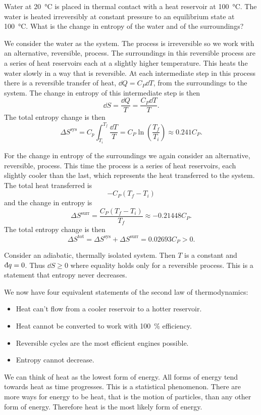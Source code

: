 \documentclass[a4paper]{article}
\newcommand{\sys}{{\mathrm{sys}}}
\newcommand{\surr}{{\mathrm{surr}}}
\newcommand{\tot}{{\mathrm{tot}}}
\newcommand{\ddbar}[1]{\text{\dj}{#1}}
\begin{document}
    \begin{example}\label{exa:heating water}
        Water at \SI{20}{\degreeCelsius} is placed in thermal contact with a heat reservoir at \SI{100}{\degreeCelsius}.
        The water is heated irreversibly at constant pressure to an equilibrium state at \SI{100}{\degreeCelsius}.
        What is the change in entropy of the water and of the surroundings?
        
        We consider the water as the system.
        The process is irreversible so we work with an alternative, reversible, process.
        The surroundings in this reversible process are a series of heat reservoirs each at a slightly higher temperature.
        This heats the water slowly in a way that is reversible.
        At each intermediate step in this process there is a reversible transfer of heat, \(\dd{Q} = C_P\dd{T}\), from the surroundings to the system.
        The change in entropy of this intermediate step is then
        \[\dd{S} = \frac{\dd{Q}}{T} = \frac{C_P\dd{T}}{T}.\]
        The total entropy change is then
        \[\Delta S^\sys = C_p\int_{T_i}^{T_f}\frac{\dd{T}}{T} = C_P\ln\left(\frac{T_f}{T_i}\right) \approx 0.241C_P.\]
        
        For the change in entropy of the surroundings we again consider an alternative, reversible, process.
        This time the process is a series of heat reservoirs, each slightly cooler than the last, which represents the heat transferred to the system.
        The total heat transferred is
        \[-C_P(T_f - T_i)\]
        and the change in entropy is
        \[\Delta S^\surr = \frac{C_P(T_f - T_i)}{T_f} \approx -0.21448C_P.\]
        The total entropy change is then
        \[\Delta S^\tot = \Delta S^\sys + \Delta S^\surr = 0.02693C_P > 0.\]
    \end{example}
    
    Consider an adiabatic, thermally isolated system.
    Then \(T\) is a constant and \(\ddbar{q} = 0\).
    Thus \(\dd{S} \ge 0\) where equality holds only for a reversible process.
    This is a statement that entropy never decreases.
    
    We now have four equivalent statements of the second law of thermodynamics:
    \begin{itemize}
        \item Heat can't flow from a cooler reservoir to a hotter reservoir.
        \item Heat cannot be converted to work with \SI{100}{\percent} efficiency.
        \item Reversible cycles are the most efficient engines possible.
        \item Entropy cannot decrease.
    \end{itemize}
    We can think of heat as the lowest form of energy.
    All forms of energy tend towards heat as time progresses.
    This is a statistical phenomenon.
    There are more ways for energy to be heat, that is the motion of particles, than any other form of energy.
    Therefore heat is the most likely form of energy.
    
\end{document}
